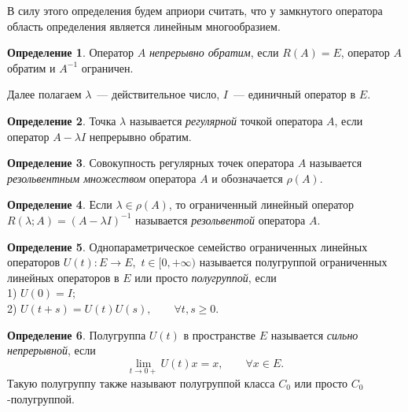 \documentclass{article}
\renewcommand{\ge}{\geqslant}
\theoremstyle{definition}
\newtheorem{definition}{Определение}
\begin{document}
В силу этого определения будем априори считать, 
что у замкнутого оператора область определения является линейным многообразием.

\begin{definition}
	Оператор $A$ \textit{непрерывно обратим}, если $R(A) = E$, оператор $A$ обратим и $A^{-1}$ ограничен.
\end{definition}

	Далее полагаем $\lambda$~--- действительное число, $I$~--- единичный оператор в $E$.
	
\begin{definition}
	Точка $\lambda$ называется \textit{регулярной} точкой оператора $A$, если оператор $A - \lambda I$ непрерывно обратим.
\end{definition}

\begin{definition}
	Совокупность регулярных точек оператора $A$ называется \textit{резольвентным множеством} оператора $A$
	и обозначается $\rho(A)$.
\end{definition}

\begin{definition} \label{resolvent}
	Если $\lambda \in \rho(A)$, то ограниченный линейный оператор \linebreak $R(\lambda; A) = (A - \lambda I)^{-1}$ называется 
	\textit{резольвентой} оператора $A$.
\end{definition}

\begin{definition} \label{semigroup}
	Однопараметрическое семейство ограниченных линейных операторов $ U(t): E \rightarrow E $, $\, t \in [0, +\infty) $ 
	называется полугруппой ограниченных линейных операторов в $E$ или просто \textit{полугруппой}, если \\
	1) $ U(0) = I $; \\
	2) $ U(t + s) = U(t)U(s), \qquad \forall t, s \ge 0 $.
\end{definition}

\begin{definition} \label{strongly continious semigroup}
	Полугруппа $ U(t)$ в пространстве $ E $ называется \textit{сильно непрерывной}, если 
	\begin{equation*}
		\lim\limits_{t \rightarrow 0+} U(t)x = x, \qquad \forall x \in E.
	\end{equation*}
	Такую полугруппу также называют полугруппой класса $ C_0 $ или просто \linebreak $ C_0\, $-полугруппой.
\end{definition}
\end{document}
